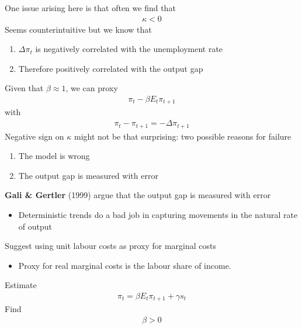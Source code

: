 \documentclass{beamer}
\begin{document}
\begin{frame}
 One issue arising here is that often we find that
  \begin{align}
    \kappa<0
  \end{align}
  Seems counterintuitive but we know that
\begin{enumerate}
  \item $\Delta\pi_t$ is negatively correlated with the unemployment rate
  \item Therefore positively correlated with the output gap
\end{enumerate}
\end{frame}

\begin{frame}
  Given that $\beta\approx1$, we can proxy
\begin{align}
  \pi_t-\beta E_t\pi_{t+1}
\end{align} 
with 
\begin{align}
  \pi_t-\pi_{t+1}=-\Delta\pi_{t+1}
\end{align}
Negative sign on $\kappa$ might not be that surprising: two possible reasons for failure
\begin{enumerate}
  \item The model is wrong
  \item The output gap is measured with error
\end{enumerate}
\end{frame}



\begin{frame}
  \textbf{Gali \& Gertler} (1999) argue that the output gap is measured with error
  \begin{itemize}
    \item Deterministic trends do a bad job in capturing movements in the natural rate of output
  \end{itemize}
  \medskip
  Suggest using unit labour costs as proxy for marginal costs
  \begin{itemize}
    \item Proxy for real marginal costs is the labour share of income.
  \end{itemize}
  Estimate 
  \begin{align}
   \pi_t = \beta E_t \pi_{t+1} + \gamma s_t    
  \end{align}
  Find
  \begin{align}
    \beta>0
  \end{align} 
\end{frame}
\end{document}
